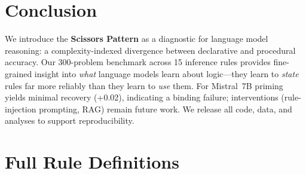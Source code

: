 \documentclass{article}
\begin{document}
\section{Conclusion}

We introduce the \textbf{Scissors Pattern} as a diagnostic for
language model reasoning: a complexity-indexed divergence between
declarative and procedural accuracy.
Our 300-problem benchmark across 15 inference rules provides fine-grained
insight into \emph{what} language models learn about logic---they learn
to \emph{state} rules far more reliably than they learn to \emph{use}
them.
For Mistral~7B priming yields minimal recovery (+0.02), indicating a
binding failure; interventions (rule-injection prompting, RAG) remain future work.
We release all code, data, and analyses to support reproducibility.




\appendix

\section{Full Rule Definitions}
\label{app:rules}
\end{document}
